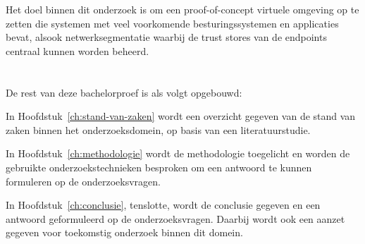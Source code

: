 Het doel binnen dit onderzoek is om een proof-of-concept virtuele omgeving op te zetten die systemen met veel voorkomende besturingssystemen en applicaties bevat, alsook netwerksegmentatie waarbij de trust stores van de endpoints centraal kunnen worden beheerd.

\section{}%
\label{sec:opzet-bachelorproef}


De rest van deze bachelorproef is als volgt opgebouwd:

In Hoofdstuk~\ref{ch:stand-van-zaken} wordt een overzicht gegeven van de stand van zaken binnen het onderzoeksdomein, op basis van een literatuurstudie.

In Hoofdstuk~\ref{ch:methodologie} wordt de methodologie toegelicht en worden de gebruikte onderzoekstechnieken besproken om een antwoord te kunnen formuleren op de onderzoeksvragen.


In Hoofdstuk~\ref{ch:conclusie}, tenslotte, wordt de conclusie gegeven en een antwoord geformuleerd op de onderzoeksvragen. Daarbij wordt ook een aanzet gegeven voor toekomstig onderzoek binnen dit domein.